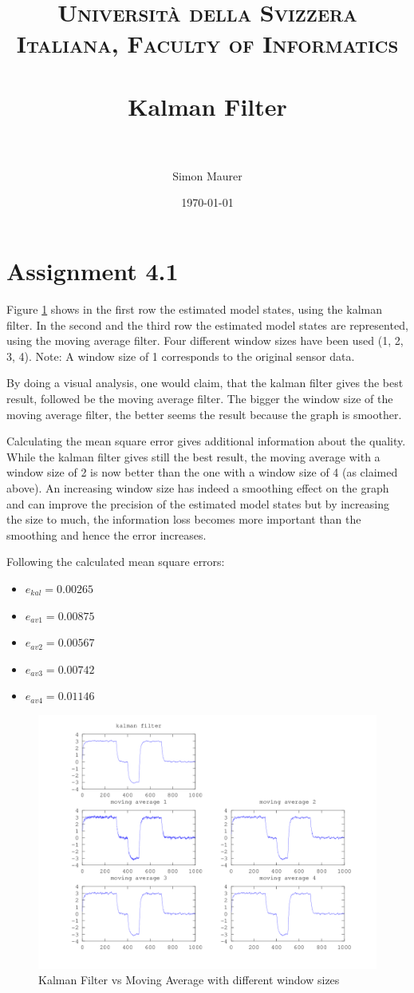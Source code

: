 \documentclass[paper=a4, fontsize=11pt]{scrartcl} %
\title{	
\normalfont \normalsize 
\textsc{Università della Svizzera Italiana, Faculty of Informatics} \\ [25pt] %
\horrule{0.5pt} \\[0.4cm] %
\huge Kalman Filter \\ %
\horrule{2pt} \\[0.5cm] %
}
\author{Simon Maurer} %
\date{\normalsize\today} %
\begin{document}
\maketitle %


\section{Assignment 4.1}

Figure \ref{fig:filter} shows in the first row the estimated model states, using
the kalman filter. In the second and the third row the estimated model states
are represented, using the moving average filter. Four different window sizes
have been used (1, 2, 3, 4). Note: A window size of 1 corresponds to the
original sensor data.

By doing a visual analysis, one would claim, that the kalman filter gives the
best result, followed be the moving average filter. The bigger the window size
of the moving average filter, the better seems the result because the graph is
smoother.

Calculating the mean square error gives additional information about the
quality. While the kalman filter gives still the best result, the moving
average with a window size of 2 is now better than the one with a window size
of 4 (as claimed above). An increasing window size has indeed a smoothing
effect on the graph and can improve the precision of the estimated model states
but by increasing the size to much, the information loss becomes more important
than the smoothing and hence the error increases.

Following the calculated mean square errors:
\begin{itemize}
    \item $ e_{kal} = 0.00265 $
    \item $ e_{av1} = 0.00875 $
    \item $ e_{av2} = 0.00567 $
    \item $ e_{av3} = 0.00742 $
    \item $ e_{av4} = 0.01146 $
\end{itemize}

\begin{figure}[h]
    \includegraphics[width=1\columnwidth]{ex04_graph}
    \caption{Kalman Filter vs Moving Average with different window sizes}
    \label{fig:filter}
\end{figure}
\end{document}
